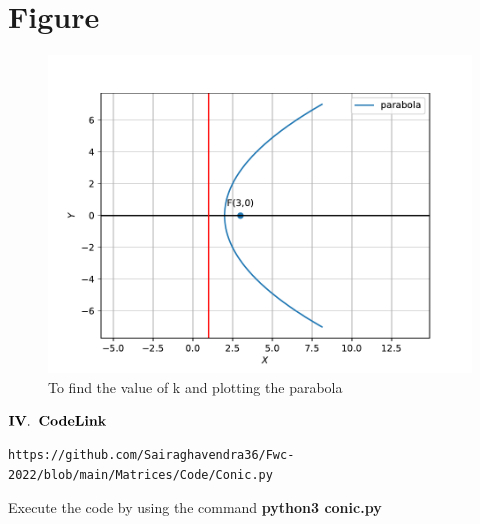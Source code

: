 \documentclass[journal,12pt,twocolumn]{IEEEtran}
\let\vec\mathbf
\begin{document}
\section{\textbf{Figure}}
\begin{figure}[h]
\includegraphics[width=\columnwidth]{fig.pdf}
\caption{To find the value of k and plotting the parabola}
    \label{fig:my_label}
\end{figure}


\begin{center}
$\vec{IV.\hspace{.2cm} Code Link}$
\end{center}
\begin{lstlisting}
https://github.com/Sairaghavendra36/Fwc-2022/blob/main/Matrices/Code/Conic.py
\end{lstlisting}
Execute the code by using the command
\textbf{python3 conic.py}
\end{document}

